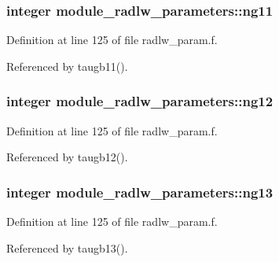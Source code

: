 \subsubsection[{\texorpdfstring{ng11}{ng11}}]{\setlength{\rightskip}{0pt plus 5cm}integer module\+\_\+radlw\+\_\+parameters\+::ng11}\hypertarget{namespacemodule__radlw__parameters_a239b6c64459896a583e88c8ba2324348}{}\label{namespacemodule__radlw__parameters_a239b6c64459896a583e88c8ba2324348}


Definition at line 125 of file radlw\+\_\+param.\+f.



Referenced by taugb11().

\subsubsection[{\texorpdfstring{ng12}{ng12}}]{\setlength{\rightskip}{0pt plus 5cm}integer module\+\_\+radlw\+\_\+parameters\+::ng12}\hypertarget{namespacemodule__radlw__parameters_a88f3b780d4dc9d4e45852fd41e111a21}{}\label{namespacemodule__radlw__parameters_a88f3b780d4dc9d4e45852fd41e111a21}


Definition at line 125 of file radlw\+\_\+param.\+f.



Referenced by taugb12().

\subsubsection[{\texorpdfstring{ng13}{ng13}}]{\setlength{\rightskip}{0pt plus 5cm}integer module\+\_\+radlw\+\_\+parameters\+::ng13}\hypertarget{namespacemodule__radlw__parameters_a30e06652ca51875c17e56138eade5add}{}\label{namespacemodule__radlw__parameters_a30e06652ca51875c17e56138eade5add}


Definition at line 125 of file radlw\+\_\+param.\+f.



Referenced by taugb13().

